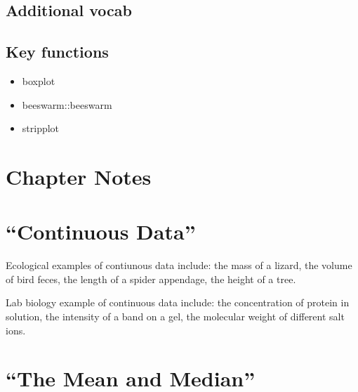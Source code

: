 \documentclass[]{book}
\providecommand{\tightlist}{%
  \setlength{\itemsep}{0pt}\setlength{\parskip}{0pt}}
\theoremstyle{definition}
\theoremstyle{definition}
\theoremstyle{definition}
\theoremstyle{remark}
\begin{document}
\subsection*{Additional vocab}\label{additional-vocab-2}

\subsection*{Key functions}\label{key-functions-5}

\begin{itemize}
\tightlist
\item
  boxplot
\item
  beeswarm::beeswarm
\item
  stripplot
\end{itemize}

\section*{Chapter Notes}\label{chapter-notes-6}

\section{\texorpdfstring{``Continuous
Data''}{Continuous Data}}\label{continuous-data}

Ecological examples of contiunous data include: the mass of a lizard,
the volume of bird feces, the length of a spider appendage, the height
of a tree.

Lab biology example of continuous data include: the concentration of
protein in solution, the intensity of a band on a gel, the molecular
weight of different salt ions.

\section{\texorpdfstring{``The Mean and
Median''}{The Mean and Median}}\label{the-mean-and-median}
\end{document}
